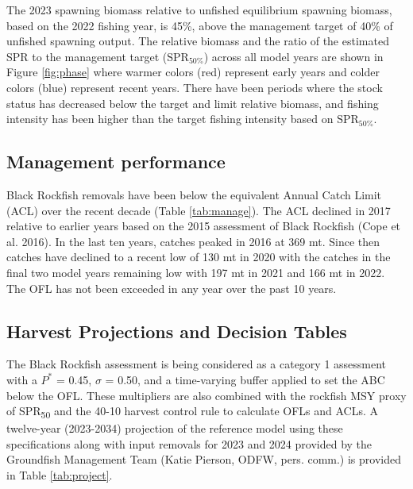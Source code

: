 \documentclass[11pt,
  letterpaper,
]{article}
\begin{document}
The 2023 spawning biomass relative to unfished equilibrium spawning biomass, based on the 2022 fishing year, is 45\%, above the management target of 40\% of unfished spawning output. The relative biomass and the ratio of the estimated SPR to the management target (\(\text{SPR}_{50\%}\)) across all model years are shown in Figure \ref{fig:phase} where warmer colors (red) represent early years and colder colors (blue) represent recent years. There have been periods where the stock status has decreased below the target and limit relative biomass, and fishing intensity has been higher than the target fishing intensity based on \(\text{SPR}_{50\%}\).

\hypertarget{management-performance-1}{%
\subsection{Management performance}\label{management-performance-1}}

Black Rockfish removals have been below the equivalent Annual Catch Limit (ACL) over the recent decade (Table \ref{tab:manage}). The ACL declined in 2017 relative to earlier years based on the 2015 assessment of Black Rockfish (Cope et al. 2016). In the last ten years, catches peaked in 2016 at 369 mt. Since then catches have declined to a recent low of 130 mt in 2020 with the catches in the final two model years remaining low with 197 mt in 2021 and 166 mt in 2022. The OFL has not been exceeded in any year over the past 10 years.

\hypertarget{harvest-projections-and-decision-tables}{%
\subsection{Harvest Projections and Decision Tables}\label{harvest-projections-and-decision-tables}}

The Black Rockfish assessment is being considered as a category 1 assessment with a \(P^*\) = 0.45, \(\sigma\) = 0.50, and a time-varying buffer applied to set the ABC below the OFL. These multipliers are also combined with the rockfish MSY proxy of SPR\textsubscript{50} and the 40-10 harvest control rule to calculate OFLs and ACLs. A twelve-year (2023-2034) projection of the reference model using these specifications along with input removals for 2023 and 2024 provided by the Groundfish Management Team (Katie Pierson, ODFW, pers. comm.) is provided in Table \ref{tab:project}.
\end{document}
